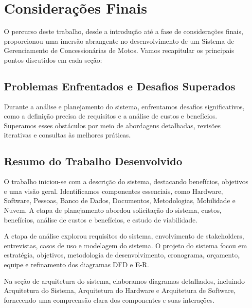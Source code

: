  

\chapter{Considera\c{c}\~{o}es Finais} 

O percurso deste trabalho, desde a introdução até a fase de considerações finais, proporcionou uma imersão abrangente no desenvolvimento de um Sistema de Gerenciamento de Concessionárias de Motos. Vamos recapitular os principais pontos discutidos em cada seção:

\section{Problemas Enfrentados e Desafios Superados}

Durante a análise e planejamento do sistema, enfrentamos desafios significativos, como a definição precisa de requisitos e a análise de custos e benefícios. Superamos esses obstáculos por meio de abordagens detalhadas, revisões iterativas e consultas às melhores práticas.

\section{Resumo do Trabalho Desenvolvido}

O trabalho iniciou-se com a descrição do sistema, destacando benefícios, objetivos e uma visão geral. Identificamos componentes essenciais, como Hardware, Software, Pessoas, Banco de Dados, Documentos, Metodologias, Mobilidade e Nuvem. A etapa de planejamento abordou solicitação do sistema, custos, benefícios, análise de custos e benefícios, e estudo de viabilidade.

A etapa de análise explorou requisitos do sistema, envolvimento de stakeholders, entrevistas, casos de uso e modelagem do sistema. O projeto do sistema focou em estratégia, objetivos, metodologia de desenvolvimento, cronograma, orçamento, equipe e refinamento dos diagramas DFD e E-R.

Na seção de arquitetura do sistema, elaboramos diagramas detalhados, incluindo Arquitetura do Sistema, Arquitetura do Hardware e Arquitetura de Software, fornecendo uma compreensão clara dos componentes e suas interações.

